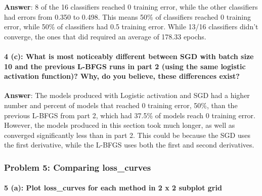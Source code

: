 \documentclass[11pt]{article}
\begin{document}
    \textbf{Answer}: 8 of the 16 classifiers reached 0 training error, while
the other classifiers had errors from 0.350 to 0.498. This means 50\% of
classifiers reached 0 training error, while 50\% of classifiers had 0.5
training error. While 13/16 classifiers didn't converge, the ones that
did required an average of 178.33 epochs.

    \hypertarget{c-what-is-most-noticeably-different-between-sgd-with-batch-size-10-and-the-previous-l-bfgs-runs-in-part-2-using-the-same-logistic-activation-function-why-do-you-believe-these-differences-exist}{%
\paragraph{4 (c): What is most noticeably different between SGD with
batch size 10 and the previous L-BFGS runs in part 2 (using the same
logistic activation function)? Why, do you believe, these differences
exist?}\label{c-what-is-most-noticeably-different-between-sgd-with-batch-size-10-and-the-previous-l-bfgs-runs-in-part-2-using-the-same-logistic-activation-function-why-do-you-believe-these-differences-exist}}

    \textbf{Answer}: The models produced with Logistic activation and SGD
had a higher number and percent of models that reached 0 training error,
50\%, than the previous L-BFGS from part 2, which had 37.5\% of models
reach 0 training error. However, the models produced in this section
took much longer, as well as converged significantly less than in part
2. This could be because the SGD uses the first derivative, while the
L-BFGS uses both the first and second derivatives.

    \hypertarget{problem-5-comparing-loss_curves}{%
\subsubsection{Problem 5: Comparing
loss\_curves}\label{problem-5-comparing-loss_curves}}

    \hypertarget{a-plot-loss_curves-for-each-method-in-2-x-2-subplot-grid}{%
\paragraph{5 (a): Plot loss\_curves for each method in 2 x 2 subplot
grid}\label{a-plot-loss_curves-for-each-method-in-2-x-2-subplot-grid}}
\end{document}

